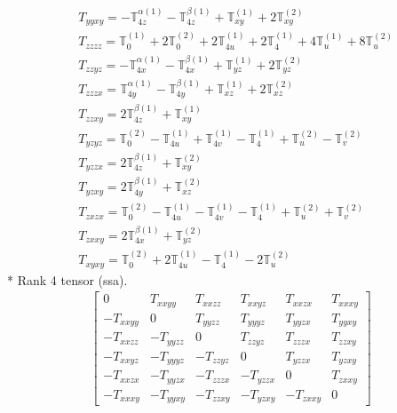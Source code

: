 \documentclass[fleqn,8pt,landscape]{jsarticle}
\begin{document}
\begin{align*}
& T_{yyxy} = - \mathbb{T}_{4z}^{\alpha(1)} - \mathbb{T}_{4z}^{\beta(1)} + \mathbb{T}_{xy}^{(1)} + 2 \mathbb{T}_{xy}^{(2)} \\
& T_{zzzz} = \mathbb{T}_{0}^{(1)} + 2 \mathbb{T}_{0}^{(2)} + 2 \mathbb{T}_{4u}^{(1)} + 2 \mathbb{T}_{4}^{(1)} + 4 \mathbb{T}_{u}^{(1)} + 8 \mathbb{T}_{u}^{(2)} \\
& T_{zzyz} = - \mathbb{T}_{4x}^{\alpha(1)} - \mathbb{T}_{4x}^{\beta(1)} + \mathbb{T}_{yz}^{(1)} + 2 \mathbb{T}_{yz}^{(2)} \\
& T_{zzzx} = \mathbb{T}_{4y}^{\alpha(1)} - \mathbb{T}_{4y}^{\beta(1)} + \mathbb{T}_{xz}^{(1)} + 2 \mathbb{T}_{xz}^{(2)} \\
& T_{zzxy} = 2 \mathbb{T}_{4z}^{\beta(1)} + \mathbb{T}_{xy}^{(1)} \\
& T_{yzyz} = \mathbb{T}_{0}^{(2)} - \mathbb{T}_{4u}^{(1)} + \mathbb{T}_{4v}^{(1)} - \mathbb{T}_{4}^{(1)} + \mathbb{T}_{u}^{(2)} - \mathbb{T}_{v}^{(2)} \\
& T_{yzzx} = 2 \mathbb{T}_{4z}^{\beta(1)} + \mathbb{T}_{xy}^{(2)} \\
& T_{yzxy} = 2 \mathbb{T}_{4y}^{\beta(1)} + \mathbb{T}_{xz}^{(2)} \\
& T_{zxzx} = \mathbb{T}_{0}^{(2)} - \mathbb{T}_{4u}^{(1)} - \mathbb{T}_{4v}^{(1)} - \mathbb{T}_{4}^{(1)} + \mathbb{T}_{u}^{(2)} + \mathbb{T}_{v}^{(2)} \\
& T_{zxxy} = 2 \mathbb{T}_{4x}^{\beta(1)} + \mathbb{T}_{yz}^{(2)} \\
& T_{xyxy} = \mathbb{T}_{0}^{(2)} + 2 \mathbb{T}_{4u}^{(1)} - \mathbb{T}_{4}^{(1)} - 2 \mathbb{T}_{u}^{(2)}
\end{align*}
* Rank 4 tensor (ssa).
\begin{align*}
\begin{bmatrix} 0 & T_{xxyy} & T_{xxzz} & T_{xxyz} & T_{xxzx} & T_{xxxy} \\ - T_{xxyy} & 0 & T_{yyzz} & T_{yyyz} & T_{yyzx} & T_{yyxy} \\ - T_{xxzz} & - T_{yyzz} & 0 & T_{zzyz} & T_{zzzx} & T_{zzxy} \\ - T_{xxyz} & - T_{yyyz} & - T_{zzyz} & 0 & T_{yzzx} & T_{yzxy} \\ - T_{xxzx} & - T_{yyzx} & - T_{zzzx} & - T_{yzzx} & 0 & T_{zxxy} \\ - T_{xxxy} & - T_{yyxy} & - T_{zzxy} & - T_{yzxy} & - T_{zxxy} & 0 \end{bmatrix}
\end{align*}
\end{document}
